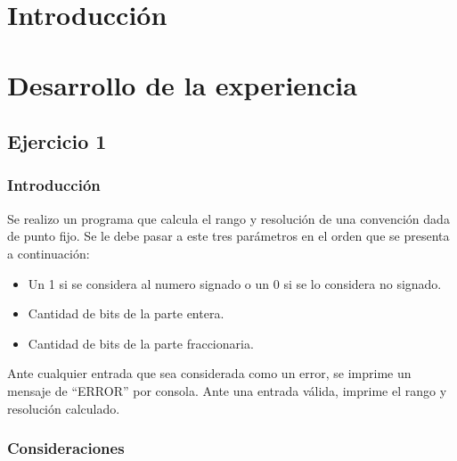 \documentclass[a4paper]{article}
\newcommand{\quotes}[1]{``#1''}
\begin{document}




\section*{Introducción}


\section*{Desarrollo de la experiencia}

\subsection*{Ejercicio 1}
\subsubsection*{Introducción}
Se realizo un programa que calcula el rango y resolución de una convención dada de punto fijo. Se le debe pasar a este tres parámetros en el orden que se presenta a continuación:
\begin{itemize}
\item Un 1 si se considera al numero signado o un 0 si se lo considera no signado.
\item Cantidad de bits de la parte entera.
\item Cantidad de bits de la parte fraccionaria.
\end{itemize}

Ante cualquier entrada que sea considerada como un error, se imprime un mensaje de \quotes{ERROR} por consola. Ante una entrada válida, imprime el rango y resolución calculado.

\subsubsection*{Consideraciones}
\end{document}
